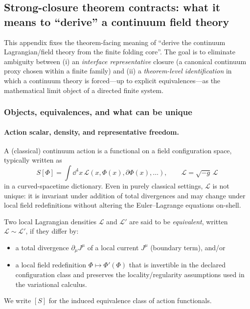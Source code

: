 \subsection{Strong-closure theorem contracts: what it means to ``derive'' a continuum field theory}
\label{app:strong_closure_theorem_contracts}

\AuditTag This appendix fixes the theorem-facing meaning of ``derive the continuum Lagrangian/field theory from the finite folding core''.
The goal is to eliminate ambiguity between (i) an \emph{interface representative} closure (a canonical continuum proxy chosen within a finite family) and (ii) a \emph{theorem-level identification} in which a continuum theory is forced---up to explicit equivalences---as the mathematical limit object of a directed finite system.

\subsubsection{Objects, equivalences, and what can be unique}
\paragraph{Action scalar, density, and representative freedom.}
\MathTag A (classical) continuum action is a functional on a field configuration space, typically written as
\[
S[\Phi]=\int \dd^4x\,\mathscr{L}(x,\Phi(x),\partial\Phi(x),\dots),
\qquad
\mathscr{L}=\sqrt{-g}\,\mathcal{L}
\]
in a curved-spacetime dictionary.
Even in purely classical settings, $\mathscr{L}$ is not unique: it is invariant under addition of total divergences and may change under local field redefinitions without altering the Euler--Lagrange equations on-shell.

\begin{definition}
\label{def:action_equivalence_class}
\MathTag Two local Lagrangian densities $\mathscr{L}$ and $\mathscr{L}'$ are said to be \emph{equivalent}, written $\mathscr{L}\sim\mathscr{L}'$, if they differ by:
\begin{itemize}
\item a total divergence $\partial_\mu J^\mu$ of a local current $J^\mu$ (boundary term), and/or
\item a local field redefinition $\Phi\mapsto \Phi'(\Phi)$ that is invertible in the declared configuration class and preserves the locality/regularity assumptions used in the variational calculus.
\end{itemize}
We write $[S]$ for the induced equivalence class of action functionals.
\end{definition}

